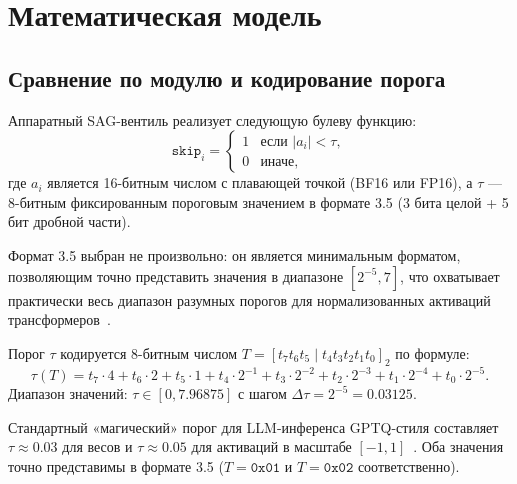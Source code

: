 \section{Математическая модель}
\label{sec:glava87-math}

\subsection{Сравнение по модулю и кодирование порога}
\label{ssec:glava87-magnitude}

Аппаратный SAG-вентиль реализует следующую булеву функцию:
\begin{equation}
  \texttt{skip}_i =
  \begin{cases}
    1 & \text{если } |a_i| < \tau, \\
    0 & \text{иначе},
  \end{cases}
  \label{eq:skip-func}
\end{equation}
где $a_i$ является 16-битным числом с плавающей точкой
(BF16 или FP16), а $\tau$ — 8-битным фиксированным пороговым
значением в формате 3.5 (3 бита целой + 5 бит дробной части).

Формат 3.5 выбран не произвольно: он является минимальным форматом,
позволяющим точно представить значения в диапазоне $[2^{-5}, 7]$,
что охватывает практически весь диапазон разумных порогов для
нормализованных активаций трансформеров~\cite{zhang2022sparsegpt}.

\begin{definition}
\label{def:threshold-format}
Порог $\tau$ кодируется 8-битным числом $T = [t_7 t_6 t_5 \mid
t_4 t_3 t_2 t_1 t_0]_2$ по формуле:
\begin{equation}
  \tau(T) = t_7 \cdot 4 + t_6 \cdot 2 + t_5 \cdot 1
            + t_4 \cdot 2^{-1} + t_3 \cdot 2^{-2}
            + t_2 \cdot 2^{-3} + t_1 \cdot 2^{-4}
            + t_0 \cdot 2^{-5}.
  \label{eq:threshold-encoding}
\end{equation}
Диапазон значений: $\tau \in [0, 7{.}96875]$ с шагом $\Delta\tau = 2^{-5}
= 0{.}03125$.
\end{definition}

\begin{remark}
Стандартный «магический» порог для LLM-инференса GPTQ-стиля составляет
$\tau \approx 0{.}03$ для весов и $\tau \approx 0{.}05$ для активаций
в масштабе $[-1, 1]$~\cite{frantar2022gptq}.  Оба значения точно
представимы в формате 3.5 ($T = \texttt{0x01}$ и $T = \texttt{0x02}$
соответственно).
\end{remark}

